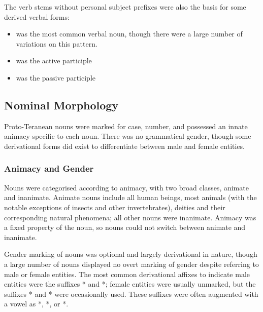 \documentclass[grammar]{subfiles}
\begin{document}
The verb stems without personal subject prefixes were also the basis for some
derived verbal forms:

\begin{itemize}
  \item {} was the most common verbal noun, though there were a
    large number of variations on this pattern.
  \item {} was the active participle
  \item {} was the passive participle
\end{itemize}


\subsection{Nominal Morphology}
\label{ssec:history:pt:nominal_morphology}

Proto-Teranean nouns were marked for case, number, and possessed an innate
animacy specific to each noun.  There was no grammatical gender, though some
derivational forms did exist to differentiate between male and female entities.

\subsubsection{Animacy and Gender}
\label{sssec:history:pt:nm:animacy}

Nouns were categorised according to animacy, with two broad classes, animate
and inanimate.  Animate nouns include all human beings, most animals (with the
notable exceptions of insects and other invertebrates), deities and their
corresponding natural phenomena; all other nouns were inanimate.  Animacy was a
fixed property of the noun, so nouns could not switch between animate and
inanimate.

Gender marking of nouns was optional and largely derivational in nature, though
a large number of nouns displayed no overt marking of gender despite referring
to male or female entities.  The most common derivational affixes to indicate
male entities were the suffixes * and *; female
entities were usually unmarked, but the suffixes * and
* were occasionally used.  These suffixes were often augmented
with a vowel as *, *, or *.
\end{document}
